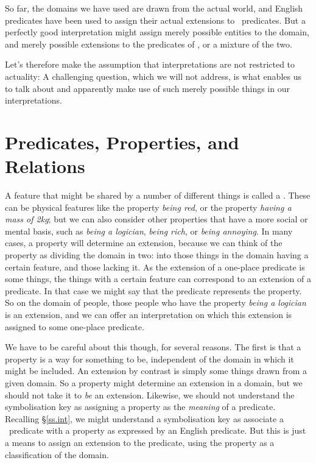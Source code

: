 \begin{earg}
So far, the domains we have used are drawn from the actual world, and English predicates have been used to assign their actual extensions to \FOL\ predicates. But a perfectly good interpretation might assign merely possible entities to the domain, and merely possible extensions to the predicates of \FOL, or a mixture of the two. 

Let's therefore make the assumption that interpretations are not restricted to actuality:  A challenging question, which we will not address, is what enables us to talk about and apparently make use of such merely possible things in our interpretations.


\section{Predicates, Properties, and Relations}\label{predrel}

A feature that might be shared by a number of different things is called a . These can be physical features like the property \emph{being red}, or the property \emph{having a mass of 2kg}; but we can also consider other properties that have a more social or mental basis, such as \emph{being a logician}, \emph{being rich}, or \emph{being annoying}. In many cases, a property will determine an extension, because we can think of the property as dividing the domain in two: into those things in the domain having a certain feature, and those lacking it. As the extension of a one-place predicate is some things, the things with a certain feature can correspond to an extension of a predicate. In that case we might say that the predicate represents the property. So on the domain of people, those people who have the property \emph{being a logician} is an extension, and we can offer an interpretation on which this extension is assigned to some one-place predicate.

We have to be careful about this though, for several reasons. The first is that a property is a way for something to be, independent of the domain in which it might be included. An extension by contrast is simply some things drawn from a given domain. So a property might determine an extension in a domain, but we should not take it to \emph{be} an extension. Likewise, we should not understand the symbolisation key as assigning a property as the \emph{meaning} of a predicate. Recalling §\ref{ss.int}, we might understand a symbolisation key as associate a \FOL\ predicate with a property as expressed by an English predicate. But this is just a means to assign an extension to the predicate, using the property as a classification of the domain. 


\end{earg}
